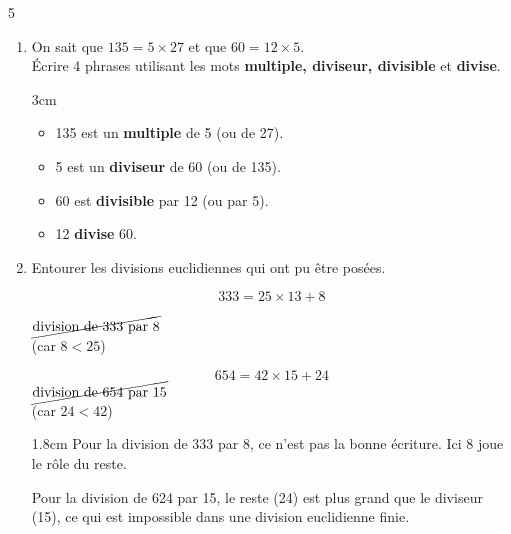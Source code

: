 \documentclass[a4paper]{book}
\begin{document}
{\begin{exerciceNote}{5}
\begin{enumerate}[leftmargin=*]
            \item On sait que $135=5\times27$ et que $60=12\times5$. \\
            Écrire 4 phrases utilisant les mots \textbf{multiple, diviseur, divisible} et \textbf{divise}. 

            \begin{ZoneReponse}{3cm}
            \begin{itemize}
                \item 135 est un \textbf{multiple} de 5 (ou de 27).
                \item 5 est un \textbf{diviseur} de 60 (ou de 135).
                \item 60 est \textbf{divisible} par 12 (ou par 5).
                \item 12 \textbf{divise} 60.
            \end{itemize}
            \end{ZoneReponse}

            \item Entourer les divisions euclidiennes qui ont pu être posées.

            \begin{minipage}{0.45\linewidth}
                \[333=25\times13+8\]
                \begin{center}
                     \quad \quad $\cancel{\text{division de 333 par 8}}$
                    \\ \quad (car $8 < 25$) \quad \hfill
                \end{center}
            \end{minipage}
            \hfill \vline \hfill
            \begin{minipage}{0.45\linewidth}
                \[654=42\times15+24\]
                 \quad \quad $\cancel{\text{division de 654 par 15}}$
                \\ \quad (car $24 < 42$) \hfill
            \end{minipage} 

            \begin{ZoneReponse}{1.8cm}
                Pour la division de 333 par 8, ce n'est pas la bonne écriture. Ici 8 joue le rôle du reste.
                
                Pour la division de 624 par 15, le reste (24) est plus grand que le diviseur (15), ce qui est impossible dans une division euclidienne finie.
            \end{ZoneReponse}
        \end{enumerate}
    \end{exerciceNote}

}
\end{document}
